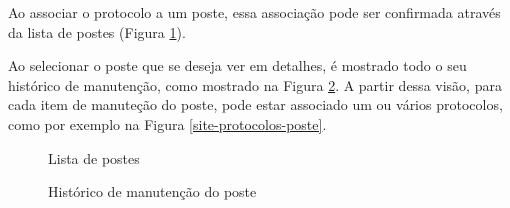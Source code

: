 \documentclass[
	article,			%
	11pt,				%
	oneside,			%
	a4paper,			%
	english,			%
	brazil,				%
	sumario=tradicional
	]{abntex2}
\begin{document}
\clearpage

Ao associar o protocolo a um poste, essa associação pode ser confirmada através da lista de postes (Figura \ref{site-lista-poste}).

Ao selecionar o poste que se deseja ver em detalhes, é mostrado todo o seu histórico de manutenção, como mostrado na Figura \ref{site-historico-manutencao}.
A partir dessa visão, para cada item de manuteção do poste, pode estar associado um ou vários protocolos, como por exemplo na Figura \ref{site-protocolos-poste}.

\begin{figure}[!htbp]
 \centering
 \caption{\label{site-lista-poste}Lista de postes}
\end{figure}

\begin{figure}[!htbp]
 \centering
 \caption{\label{site-historico-manutencao}Histórico de manutenção do poste}
\end{figure}
\end{document}
